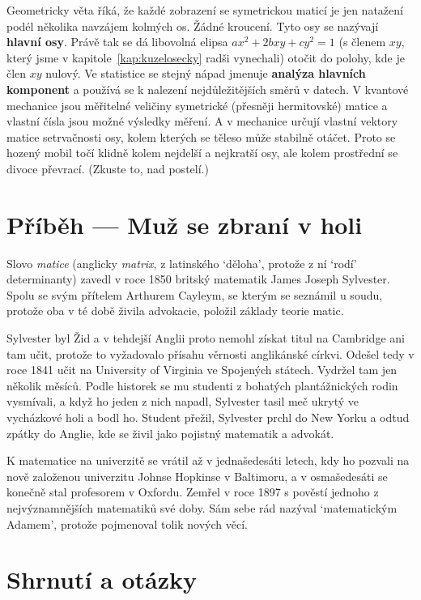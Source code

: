 Geometricky věta říká, že každé zobrazení se symetrickou maticí je jen natažení podél několika navzájem kolmých os. Žádné kroucení. Tyto osy se nazývají \textbf{hlavní osy}. Právě tak se dá libovolná elipsa $ax^2 + 2bxy + cy^2 = 1$ (s členem $xy$, který jsme v kapitole~\ref{kap:kuzelosecky} radši vynechali) otočit do polohy, kde je člen $xy$ nulový. Ve statistice se stejný nápad jmenuje \textbf{analýza hlavních komponent} a používá se k nalezení nejdůležitějších směrů v datech. V kvantové mechanice jsou měřitelné veličiny symetrické (přesněji hermitovské) matice a vlastní čísla jsou možné výsledky měření. A v mechanice určují vlastní vektory matice setrvačnosti osy, kolem kterých se těleso může stabilně otáčet. Proto se hozený mobil točí klidně kolem nejdelší a nejkratší osy, ale kolem prostřední se divoce převrací. (Zkuste to, nad postelí.)

\section{Příběh --- Muž se zbraní v holi}

Slovo \textit{matice} (anglicky \textit{matrix}, z latinského `děloha', protože z ní `rodí' determinanty) zavedl v roce 1850 britský matematik James Joseph Sylvester. Spolu se svým přítelem Arthurem Cayleym, se kterým se seznámil u soudu, protože oba v té době živila advokacie, položil základy teorie matic.

Sylvester byl Žid a v tehdejší Anglii proto nemohl získat titul na Cambridge ani tam učit, protože to vyžadovalo přísahu věrnosti anglikánské církvi. Odešel tedy v roce 1841 učit na University of Virginia ve Spojených státech. Vydržel tam jen několik měsíců. Podle historek se mu studenti z bohatých plantážnických rodin vysmívali, a když ho jeden z nich napadl, Sylvester tasil meč ukrytý ve vycházkové holi a bodl ho. Student přežil, Sylvester prchl do New Yorku a odtud zpátky do Anglie, kde se živil jako pojistný matematik a advokát.

K matematice na univerzitě se vrátil až v jednašedesáti letech, kdy ho pozvali na nově založenou univerzitu Johnse Hopkinse v Baltimoru, a v osmašedesáti se konečně stal profesorem v Oxfordu. Zemřel v roce 1897 s pověstí jednoho z nejvýznamnějších matematiků své doby. Sám sebe rád nazýval `matematickým Adamem', protože pojmenoval tolik nových věcí.

\section{Shrnutí a otázky}


